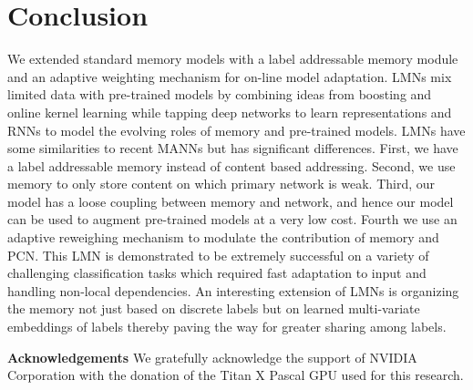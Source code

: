 \documentclass[letterpaper]{article} %
\begin{document}
\vspace{-0.79mm}
\section{Conclusion}
We extended standard memory models with a label addressable memory module and an adaptive weighting mechanism for on-line model adaptation.
LMNs mix limited data with pre-trained models by combining ideas from boosting and online kernel learning while tapping deep networks to learn representations and RNNs to model the evolving roles of memory and pre-trained models.
LMNs have some similarities to recent MANNs but has significant differences.
First, we have a label addressable memory instead of content based addressing. Second, we use memory to only store content on which primary network is weak.
Third, our model has a loose coupling between memory and network, and hence our model can be used to augment pre-trained models at a very low cost.
Fourth we use an adaptive reweighing mechanism to modulate the contribution of memory and PCN.
This LMN is demonstrated to be extremely successful on a variety of challenging classification tasks which required fast adaptation to input and handling non-local dependencies.
An interesting extension of LMNs is organizing the memory not just based on discrete labels but on learned multi-variate embeddings of labels
thereby paving the way for greater sharing among labels.


\textbf{Acknowledgements} We gratefully acknowledge the support of NVIDIA Corporation with the donation of the Titan X Pascal GPU used for this research.
\end{document}
